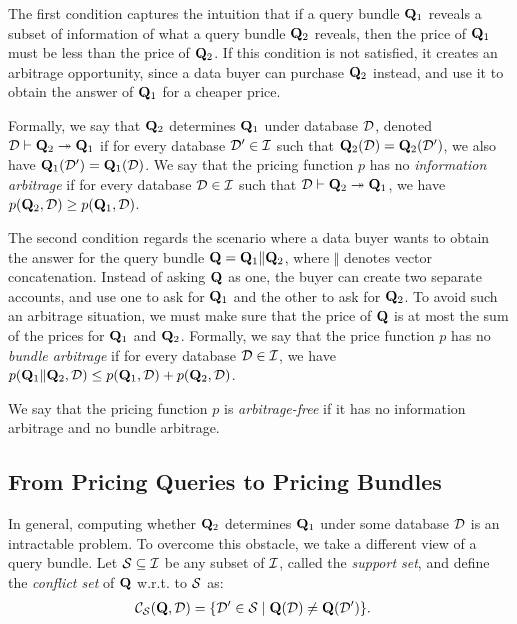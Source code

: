  The first condition captures the intuition that if a query bundle $\mathbf{Q}_1$ reveals a subset of information of what a query bundle $\mathbf{Q}_2$ reveals, then the price of $\mathbf{Q}_1$ must be less than the price of $\mathbf{Q}_2$. If this condition is not satisfied, it creates an arbitrage opportunity, since a data buyer can purchase $\mathbf{Q}_2$ instead, and use it to obtain the answer of $\mathbf{Q}_1$ for a cheaper price. 

Formally, we say that $\mathbf{Q}_2$ determines $\mathbf{Q}_1$ under database $\mathcal{D}$, denoted $\mathcal{D} \vdash \mathbf{Q}_2 \twoheadrightarrow \mathbf{Q}_1$ if for every database $\mathcal{D}' \in \mathcal{I}$ such that $\mathbf{Q}_2(\mathcal{D}) = \mathbf{Q}_2(\mathcal{D}')$, we also have  $\mathbf{Q}_1(\mathcal{D}') = \mathbf{Q}_1(\mathcal{D})$.
We say that the pricing function $p$ has no {\em information arbitrage} if for every database $\mathcal{D} \in \mathcal{I}$ such that $\mathcal{D} \vdash \mathbf{Q}_2 \twoheadrightarrow \mathbf{Q}_1$, we have $p(\mathbf{Q}_2, \mathcal{D}) \geq  p(\mathbf{Q}_1, \mathcal{D})$. 

 The second condition regards the scenario where a data buyer wants to obtain the answer for the query bundle $\mathbf{Q} = \mathbf{Q}_1\Vert \mathbf{Q}_2$, where $\Vert$ denotes vector concatenation. Instead of asking $\mathbf{Q}$ as one, the buyer can create two separate accounts, and use one to ask for $\mathbf{Q}_1$ and the other to ask for $\mathbf{Q}_2$. To avoid such an arbitrage situation, we must make sure that the price of $\mathbf{Q}$ is at most the sum of the prices for $\mathbf{Q}_1$ and  $\mathbf{Q}_2$. 
%
Formally, we say that the price function $p$ has no {\em bundle arbitrage} if for every database $\mathcal{D} \in \mathcal{I}$, we have $p(\mathbf{Q}_1\Vert \mathbf{Q}_2, \mathcal{D}) \leq p(\mathbf{Q}_1, \mathcal{D}) + p(\mathbf{Q}_2, \mathcal{D})$.

We say that the pricing function $p$ is {\em arbitrage-free} if it has no information arbitrage and no bundle arbitrage. 

\subsection{From Pricing Queries to Pricing Bundles}

In general, computing whether $\mathbf{Q}_2$ determines $\mathbf{Q}_1$ under some database $\mathcal{D}$ is an intractable problem. To overcome this obstacle, we take a different view of a query bundle. Let 
$\mathcal{S} \subseteq \mathcal{I}$ be any subset of $\mathcal{I}$, called the {\em support set}, and define the {\em conflict set} of $\mathbf{Q}$ w.r.t. to $\mathcal{S}$ as:
%
\begin{align*}
{\mathcal{C}}_{\mathcal{S}}(\mathbf{Q},\mathcal{D})  &= \{{\mathcal{D}' \in \mathcal{S}}\mid{\mathbf{Q}(\mathcal{D}) \neq \mathbf{Q}(\mathcal{D}')}\}. 
\end{align*}

